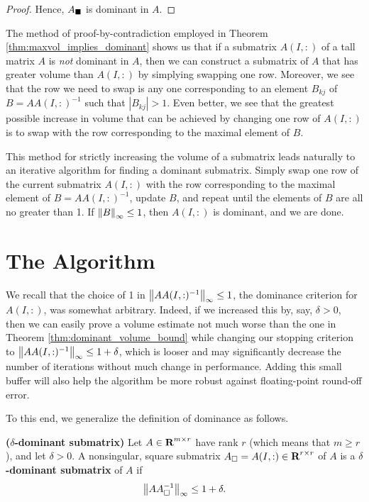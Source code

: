 \documentclass{article}
\begin{document}
\begin{thm}
\begin{proof}
			Hence, $A_\blacksquare$ is dominant in $A$.
		\end{proof}
	\end{thm}
	
	
	The method of proof-by-contradiction employed in Theorem \ref{thm:maxvol_implies_dominant} shows us that if a submatrix $A(I,:)$ of a tall matrix $A$ is \textit{not} dominant in $A$, then we can construct a submatrix of $A$ that has greater volume than $A(I,:)$ by simplying swapping one row. Moreover, we see that the row we need to swap is any one corresponding to an element $B_{kj}$ of $B = AA(I,:)^{-1}$ such that $|B_{kj}| > 1$. Even better, we see that the greatest possible increase in volume that can be achieved by changing one row of $A(I,:)$ is to swap with the row corresponding to the maximal element of $B$.
	
	This method for strictly increasing the volume of a submatrix leads naturally to an iterative algorithm for finding a dominant submatrix. Simply swap one row of the current submatrix $A(I,:)$ with the row corresponding to the maximal element of $B = AA(I,:)^{-1}$, update $B$, and repeat until the elements of $B$ are all no greater than 1. If $\left\lVert B \right\rVert_\infty \le 1$, then $A(I,:)$ is dominant, and we are done.
	
	\section{The \maxvol{} Algorithm}
	
	
	We recall that the choice of 1 in $\left\lVert AA(I,:)^{-1} \right\rVert_\infty \le 1$, the dominance criterion for $A(I,:)$, was somewhat arbitrary. Indeed, if we increased this by, say, $\delta > 0$, then we can easily prove a volume estimate not much worse than the one in Theorem \ref{thm:dominant_volume_bound} while changing our stopping criterion to $\left\lVert AA(I,:)^{-1} \right\rVert_\infty \le 1 + \delta$, which is looser and may significantly decrease the number of iterations without much change in performance. Adding this small buffer will also help the algorithm be more robust against floating-point round-off error.
	
	To this end, we generalize the definition of dominance as follows.
	
	\begin{dfn} \textnormal{\bf($\delta$-dominant submatrix)}
		\label{def:delta_dominant_submatrix}
		Let $A \in \textnormal{\bf R}^{m\times r}$ have rank $r$ (which means that $m \ge r$), and let $\delta > 0$. A nonsingular, square submatrix $A_\square = A(I,:) \in \textnormal{\bf R}^{r\times r}$ of $A$ is a \textbf{$\delta$-dominant submatrix} of $A$ if
		\begin{equation}
			\left\lVert AA_{\square}^{-1} \right\rVert_\infty \le 1 + \delta.
		\end{equation}
	\end{dfn}
	
\end{document}
